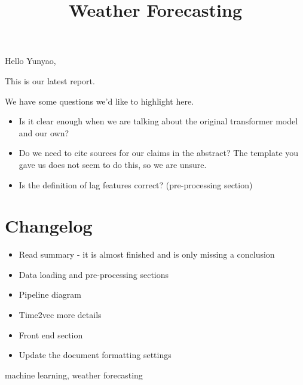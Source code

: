 



Hello Yunyao,

This is our latest report.

We have some questions we'd like to highlight here.

\begin{itemize}
    \item Is it clear enough when we are talking about the original transformer model and our own? 
    \item Do we need to cite sources for our claims in the abstract? The template you gave us does not seem to do this, so we are unsure.
    \item Is the definition of lag features correct? (pre-processing section)
\end{itemize}

\section{Changelog}
\begin{itemize}
    \item Read summary - it is almost finished and is only missing a conclusion
    \item Data loading and pre-processing sections
    \item Pipeline diagram
    \item Time2vec more details
    \item Front end section
    \item Update the document formatting settings 
\end{itemize}




\newpage

\title{Weather Forecasting}
\author{
    \and
    \and
    \and
}


\maketitle

\begin{abstract}

\end{abstract}

\begin{IEEEkeywords}
machine learning, weather forecasting
\end{IEEEkeywords}

